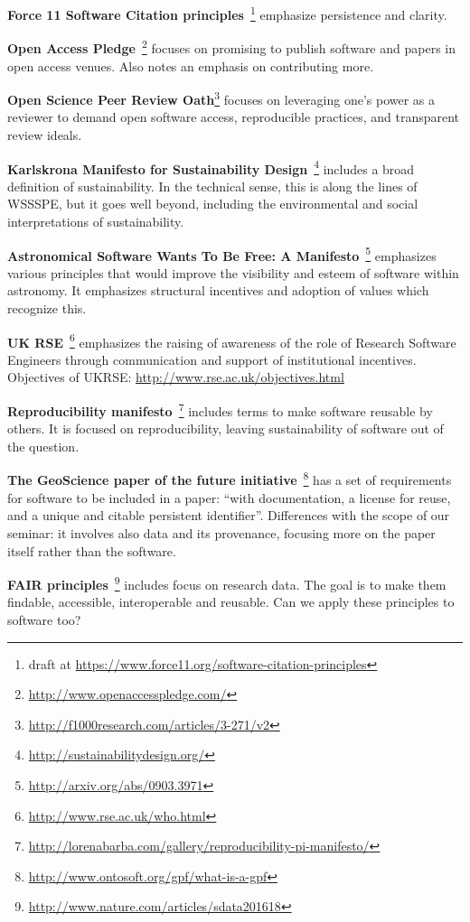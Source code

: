\documentclass[a4paper,UKenglish]{dagman}
\newcommand{\manifesto}[1]{{\bf #1}\xspace}
\begin{document}
\begin{appendix}
\manifesto{Force 11 Software Citation principles}~\cite{arfon_m._smith_software_2016}\footnote{draft at 
\url{https://www.force11.org/software-citation-principles}}
emphasize persistence and clarity.

\manifesto{Open Access Pledge}~\cite{alex_holcombe_open_2011}\footnote{\url{http://www.openaccesspledge.com/}}
focuses on promising to publish software and papers in open access venues.
Also notes an emphasis on contributing more.

\manifesto{Open Science Peer Review Oath}\footnote{\url{http://f1000research.com/articles/3-271/v2}}
focuses on leveraging one's power as a reviewer to demand open software access, reproducible practices, and transparent review ideals.

\manifesto{Karlskrona Manifesto for Sustainability Design}~\cite{becker_karlskrona_2014}\footnote{\url{http://sustainabilitydesign.org/}}
includes a broad definition of sustainability. In the technical sense, this is along the lines of WSSSPE, but it goes well beyond, including the environmental and social interpretations of sustainability.

\manifesto{Astronomical Software Wants To Be Free: A Manifesto}~\cite{weiner_astronomical_2009}\footnote{\url{http://arxiv.org/abs/0903.3971}}
emphasizes various principles that would improve the visibility and esteem of software within astronomy. It emphasizes structural incentives and adoption of values which recognize this. 

\manifesto{UK RSE}~\cite{rse_conference_2016_what_2016}\footnote{\url{http://www.rse.ac.uk/who.html}}
emphasizes the raising of awareness of the role of Research Software Engineers through communication and support of institutional incentives.
Objectives of UKRSE: \url{http://www.rse.ac.uk/objectives.html}

\manifesto{Reproducibility manifesto}~\cite{barba_reproducibility_2012}\footnote{\url{http://lorenabarba.com/gallery/reproducibility-pi-manifesto/}}
includes terms to make software reusable by others. It is focused on reproducibility, leaving sustainability of software out of the question.

\manifesto{The GeoScience paper of the future initiative}~\cite{onto_soft_what_2016}\footnote{\url{http://www.ontosoft.org/gpf/what-is-a-gpf}}
has a set of requirements for software to be included in a paper: ``with documentation, a license for reuse, and a unique and citable persistent identifier''. Differences with the scope of our seminar: it involves also data and its provenance, focusing more on the paper itself rather than the software.

\manifesto{FAIR principles}~\cite{wilkinson_fair_2016}\footnote{\url{http://www.nature.com/articles/sdata201618}}
includes focus on research data. The goal is to make them findable, accessible, interoperable and reusable. Can we apply these principles to software too?


% 



\end{appendix}
\end{document}

